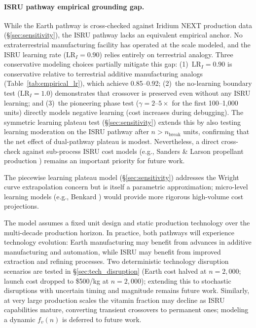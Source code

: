\documentclass[preprint,12pt]{elsarticle}
\begin{document}
\paragraph{ISRU pathway empirical grounding gap.} While the Earth pathway is cross-checked against Iridium NEXT production data (\S\ref{sec:sensitivity}), the ISRU pathway lacks an equivalent empirical anchor. No extraterrestrial manufacturing facility has operated at the scale modeled, and the ISRU learning rate ($\mathrm{LR}_I = 0.90$) relies entirely on terrestrial analogy. Three conservative modeling choices partially mitigate this gap: (1)~$\mathrm{LR}_I = 0.90$ is conservative relative to terrestrial additive manufacturing analogs (Table~\ref{tab:empirical_lr}), which achieve 0.85--0.92; (2)~the no-learning boundary test ($\mathrm{LR}_I = 1.0$) demonstrates that crossover is preserved even without any ISRU learning; and (3)~the pioneering phase test ($\gamma = 2$--$5\times$ for the first 100--1{,}000 units) directly models negative learning (cost increases during debugging). The symmetric learning plateau test (\S\ref{sec:sensitivity}) extends this by also testing learning moderation on the ISRU pathway after $n > n_{\mathrm{break}}$ units, confirming that the net effect of dual-pathway plateau is modest. Nevertheless, a direct cross-check against sub-process ISRU cost models (e.g., Sanders \& Larson propellant production \cite{sanders2015}) remains an important priority for future work.

The piecewise learning plateau model (\S\ref{sec:sensitivity}) addresses the Wright curve extrapolation concern but is itself a parametric approximation; micro-level learning models (e.g., Benkard \cite{benkard2000}) would provide more rigorous high-volume cost projections.

The model assumes a fixed unit design and static production technology over the multi-decade production horizon. In practice, both pathways will experience technology evolution: Earth manufacturing may benefit from advances in additive manufacturing and automation, while ISRU may benefit from improved extraction and refining processes. Two deterministic technology disruption scenarios are tested in \S\ref{sec:tech_disruption} (Earth cost halved at $n = 2{,}000$; launch cost dropped to \$500/kg at $n = 2{,}000$); extending this to stochastic disruptions with uncertain timing and magnitude remains future work. Similarly, at very large production scales the vitamin fraction may decline as ISRU capabilities mature, converting transient crossovers to permanent ones; modeling a dynamic $f_v(n)$ is deferred to future work.
\end{document}
